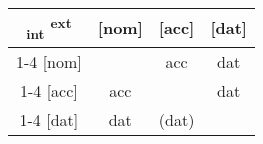 
\begin{tabular}{c|c|c|c}
  \toprule
      \textsubscript{\ac{int}} \textsuperscript{\ac{ext}}
        & [\ac{nom}]
        & [\ac{acc}]
        & [\ac{dat}]
        \\ \cmidrule{1-4}
    [\ac{nom}]
        & \xcancel{\phantom{xx}}
        & \ac{acc}
        & \ac{dat}
        \\ \cmidrule{1-4}
    [\ac{acc}]
        & \ac{acc}
        & \xcancel{\phantom{xx}}
        & \ac{dat}
        \\ \cmidrule{1-4}
    [\ac{dat}]
        & \ac{dat}
        & (\ac{dat})
        & \xcancel{\phantom{xx}}
        \\
  \bottomrule
\end{tabular}
